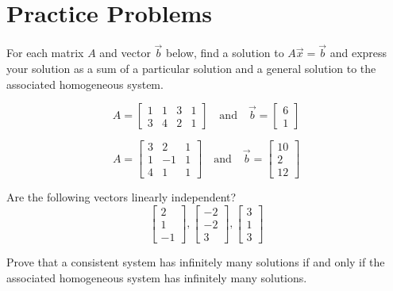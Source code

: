 \documentclass{ximera}
\begin{document}
\section*{Practice Problems}

\begin{problem}
For each matrix $A$ and vector $\vec{b}$ below, find a solution to $A\vec{x}=\vec{b}$ and  express your solution as a sum of a particular solution and a general solution to the associated homogeneous system.

\begin{problem}
$$A=\begin{bmatrix}1&1&3&1\\3&4&2&1\end{bmatrix}\quad\text{and}\quad\vec{b}=\begin{bmatrix}6\\1\end{bmatrix}$$
\end{problem}

\begin{problem}
$$A=\begin{bmatrix}3&2&1\\1&-1&1\\4&1&1\end{bmatrix}\quad\text{and}\quad\vec{b}=\begin{bmatrix}10\\2\\12\end{bmatrix}$$
\end{problem}
\end{problem}

\begin{problem}
Are the following vectors linearly independent?
$$\begin{bmatrix}2\\1\\-1\end{bmatrix}, \begin{bmatrix}-2\\-2\\3\end{bmatrix}, \begin{bmatrix}3\\1\\3\end{bmatrix} $$
\end{problem}

\begin{problem}Prove that a consistent system has infinitely many solutions if and only if the associated homogeneous system has infinitely many solutions.
\end{problem}
\end{document}

